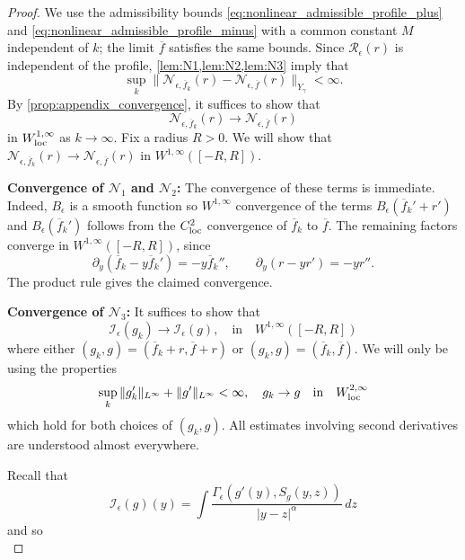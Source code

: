 \documentclass[11pt]{amsart}
\theoremstyle{definition}
\theoremstyle{remark}
\numberwithin{equation}{section}
\newcommand{\mc}[1]{\mathcal{#1}}
\newcommand{\ov}[1]{\overline{#1}}
\begin{document}
\begin{proof}
    We use the admissibility bounds \eqref{eq:nonlinear_admissible_profile_plus} and \eqref{eq:nonlinear_admissible_profile_minus} with a common constant $M$ independent of $k$; the limit $\ov{f}$ satisfies the same bounds. Since $\mc{R}_\epsilon(r)$ is independent of the profile, \cref{lem:N1,lem:N2,lem:N3} imply that
    \begin{equation}\label{eq:nonlinear_continuity_uniform_bound}\sup_k\|\mc{N}_{\epsilon, \ov{f}_k}(r)-\mc{N}_{\epsilon, \ov{f}}(r)\|_{Y_\gamma}<\infty.\end{equation}
    By \cref{prop:appendix_convergence}, it suffices to show that
    \[\mc{N}_{\epsilon, \ov{f}_k}(r) \to \mc{N}_{\epsilon, \ov{f}}(r)\]
    in $W^{1, \infty}_{\textup{loc}}$ as $k \to \infty$. Fix a radius $R > 0$. We will show that $\mc{N}_{\epsilon, \ov{f}_k}(r) \to \mc{N}_{\epsilon, \ov{f}}(r)$ in $W^{1, \infty}([-R, R])$. \par
    \textbf{Convergence of $\mc{N}_1$ and $\mc{N}_2$:} The convergence of these terms is immediate. Indeed, $B_{\epsilon}$ is a smooth function so $W^{1,\infty}$ convergence of the terms $B_\epsilon(\ov{f}_k' + r')$ and $B_\epsilon(\ov{f}_k')$ follows from the $C^2_{\textup{loc}}$ convergence of $\ov{f}_k$ to $\ov{f}$. The remaining factors converge in $W^{1,\infty}([-R,R])$, since
    \[\partial_y(\ov{f}_k-y\ov{f}_k')=-y\ov{f}_k'',\qquad \partial_y(r-yr')=-yr''.\]
    The product rule gives the claimed convergence. \par
    \textbf{Convergence of $\mc{N}_3$:} It suffices to show that 
    \begin{equation}\label{eq:nonlinear_continuity_local}\mc{I}_\epsilon(g_k) \to \mc{I}_{\epsilon}(g), \quad \text{in} \quad W^{1, \infty}([-R, R])\end{equation}
    where either $(g_k, g) = (\ov{f}_k + r, \ov{f} + r)$ or $(g_k, g) = (\ov{f}_k, \ov{f})$. We will only be using the properties
    \begin{equation}\label{eq:nonlinear_continuity_profiles}\sup_{k}\|g_k'\|_{L^\infty} + \|g'\|_{L^\infty} < \infty, \quad g_k \to g \quad \text{in} \quad W^{2,\infty}_{\textup{loc}}\end{equation}
    which hold for both choices of $(g_k, g)$. All estimates involving second derivatives are understood almost everywhere. \par
    Recall that
    \[\mc{I}_\epsilon(g)(y) = \int \frac{\Gamma_\epsilon(g'(y), S_g(y, z))}{|y-z|^\alpha}\,dz\]
    and so 
    \begin{equation}\label{eq:nonlinear_continuity_derivative}

\end{equation}
\end{proof}
\end{document}
